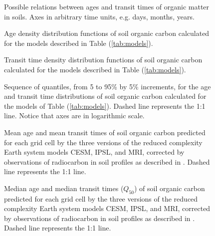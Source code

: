 \documentclass[draft,linenumbers]{agujournal}
\begin{document}
\begin{figure}[t]
   \centering
   \caption{Possible relations between ages and transit times of organic matter in soils. Axes in arbitrary time units, e.g. days, months, years.}
   \label{fig:hypotheses}
\end{figure}

\begin{figure}[t]
   \centering
   \caption{Age density distribution functions of soil organic carbon calculated for the models described in Table (\ref{tab:models}).}
   \label{fig:ageDensity}
\end{figure}

\begin{figure}[t]
   \centering
   \caption{Transit time density distribution functions of soil organic carbon calculated for the models described in Table (\ref{tab:models}).}
   \label{fig:ttDensity}
\end{figure}

\begin{figure}[t]
   \centering
   \caption{Sequence of quantiles, from 5 to 95\% by 5\% increments, for the age and transit time distributions of soil organic carbon calculated for the models of Table (\ref{tab:models}). Dashed line represents the 1:1 line. Notice that axes are in logarithmic scale.}
   \label{fig:quantiles}
\end{figure}

\begin{figure}[htbp]
   \centering
   \caption{Mean age and mean transit times of soil organic carbon predicted for each grid cell by the three versions of the reduced complexity Earth system models CESM, IPSL, and MRI, corrected by observations of radiocarbon in soil profiles as described in \citet{He2016}. Dashed line represents the 1:1 line. }
   \label{fig:sattESMs}
\end{figure}

\begin{figure}[htbp]
   \centering
   \caption{Median age and median transit times ($Q_{50}$) of soil organic carbon predicted for each grid cell by the three versions of the reduced complexity Earth system models CESM, IPSL, and MRI, corrected by observations of radiocarbon in soil profiles as described in \citet{He2016}. Dashed line represents the 1:1 line. }
   \label{fig:Q50ESMs}
\end{figure}
\end{document}

